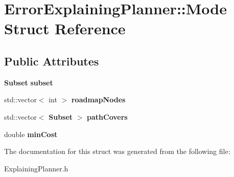 \section{Error\+Explaining\+Planner\+:\+:Mode Struct Reference}
\label{structErrorExplainingPlanner_1_1Mode}
\subsection*{Public Attributes}
\begin{DoxyCompactItemize}
\item 
{\bf Subset} {\bfseries subset}\label{structErrorExplainingPlanner_1_1Mode_a59867a943e1d0a3078cf5cc437310b11}

\item 
std\+::vector$<$ int $>$ {\bfseries roadmap\+Nodes}\label{structErrorExplainingPlanner_1_1Mode_a04ad8e6a49a3dad51c2d2d1796b14c22}

\item 
std\+::vector$<$ {\bf Subset} $>$ {\bfseries path\+Covers}\label{structErrorExplainingPlanner_1_1Mode_a44b45dfb0750f9398c03052d61f8eb73}

\item 
double {\bfseries min\+Cost}\label{structErrorExplainingPlanner_1_1Mode_a9b273fbfb8ce1228dc9e93640829d5ef}

\end{DoxyCompactItemize}


The documentation for this struct was generated from the following file\+:\begin{DoxyCompactItemize}
\item 
Explaining\+Planner.\+h\end{DoxyCompactItemize}
